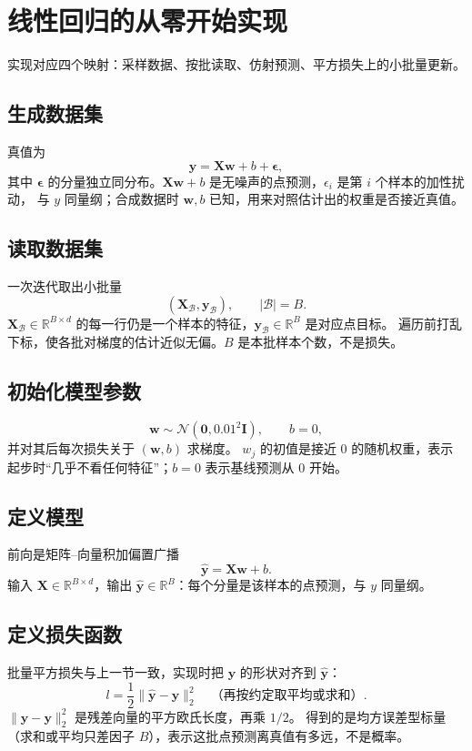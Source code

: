\section{线性回归的从零开始实现}

实现对应四个映射：采样数据、按批读取、仿射预测、平方损失上的小批量更新。

\subsection{生成数据集}

真值为
\[
\bm{y}=\bm{X}\bm{w}+b+\bm{\epsilon},
\]
其中 $\bm{\epsilon}$ 的分量独立同分布。$\bm{X}\bm{w}+b$ 是无噪声的点预测，$\epsilon_i$ 是第 $i$ 个样本的加性扰动，
与 $y$ 同量纲；合成数据时 $\bm{w},b$ 已知，用来对照估计出的权重是否接近真值。

\subsection{读取数据集}

一次迭代取出小批量
\[
(\bm{X}_{\mathcal{B}},\bm{y}_{\mathcal{B}}),\qquad
|\mathcal{B}|=B.
\]
$\bm{X}_{\mathcal{B}}\in\mathbb{R}^{B\times d}$ 的每一行仍是一个样本的特征，$\bm{y}_{\mathcal{B}}\in\mathbb{R}^{B}$ 是对应点目标。
遍历前打乱下标，使各批对梯度的估计近似无偏。$B$ 是本批样本个数，不是损失。

\subsection{初始化模型参数}

\[
\bm{w}\sim\mathcal{N}(\bm{0},0.01^{2}\bm{I}),\qquad b=0,
\]
并对其后每次损失关于 $(\bm{w},b)$ 求梯度。
$w_j$ 的初值是接近 $0$ 的随机权重，表示起步时“几乎不看任何特征”；$b=0$ 表示基线预测从 $0$ 开始。

\subsection{定义模型}

前向是矩阵--向量积加偏置广播
\[
\hat{\bm{y}}=\bm{X}\bm{w}+b.
\]
输入 $\bm{X}\in\mathbb{R}^{B\times d}$，输出 $\hat{\bm{y}}\in\mathbb{R}^{B}$：每个分量是该样本的点预测，与 $y$ 同量纲。

\subsection{定义损失函数}

批量平方损失与上一节一致，实现时把 $\bm{y}$ 的形状对齐到 $\hat{\bm{y}}$：
\[
l=\frac{1}{2}\|\hat{\bm{y}}-\bm{y}\|_{2}^{2}
\quad\text{（再按约定取平均或求和）}.
\]
$\|\hat{\bm{y}}-\bm{y}\|_{2}^{2}$ 是残差向量的平方欧氏长度，再乘 $1/2$。
得到的是均方误差型标量（求和或平均只差因子 $B$），表示这批点预测离真值有多远，不是概率。

